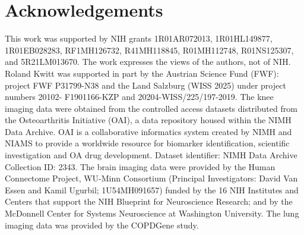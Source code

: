 \section{Acknowledgements}
\vspace{-0.15cm}
This work was supported by NIH grants 1R01AR072013, 1R01HL149877, 1R01EB028283, RF1MH126732, R41MH118845, R01MH112748, R01NS125307, and 5R21LM013670. The work expresses the views of the authors, not of NIH. Roland Kwitt was supported in part by the Austrian Science Fund (FWF): project FWF P31799-N38 and the Land Salzburg (WISS 2025) under project numbers 20102- F1901166-KZP and 20204-WISS/225/197-2019. The knee imaging data were obtained from the controlled access datasets distributed from the Osteoarthritis Initiative (OAI), a data repository housed within the NIMH Data Archive. OAI is a collaborative informatics system created by NIMH and NIAMS to provide a worldwide resource for biomarker identification, scientific investigation and OA drug development. Dataset identifier: NIMH Data Archive Collection ID: 2343. The brain imaging data were provided by the Human Connectome Project, WU-Minn Consortium (Principal Investigators: David Van Essen and Kamil Ugurbil; 1U54MH091657) funded by the 16 NIH Institutes and Centers that support the NIH Blueprint for Neuroscience Research; and by the McDonnell Center for Systems Neuroscience at Washington University. The lung imaging data was provided by the COPDGene study.
\clearpage
{\small
	
	
}
